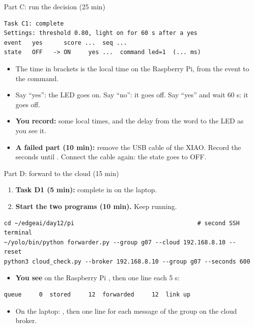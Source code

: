 \begin{frame}[fragile]{Part C: run the decision (25 min)}
\begin{lstlisting}[style=shell]
Task C1: complete
Settings: threshold 0.80, light on for 60 s after a yes
event   yes      score ...  seq ...
state   OFF   -> ON     yes ...  command led=1  (... ms)
\end{lstlisting}
  \small
  \begin{itemize}
    \item The time in brackets is the local time on the Raspberry Pi, from
          the event to the command.
    \item Say ``yes'': the LED goes on. Say ``no'': it goes off. Say ``yes''
          and wait 60 s: it goes off.
    \item \textbf{You record:} some local times, and the delay from the word
          to the LED as you see it.
    \item \textbf{A failed part (10 min):} remove the USB cable of the XIAO.
          Record the seconds until . Connect
          the cable again: the state goes to OFF.
  \end{itemize}
\end{frame}

\begin{frame}[fragile]{Part D: forward to the cloud (15 min)}
  \small
  \begin{enumerate}
    \item \textbf{Task D1 (5 min):} complete  in
           on the laptop.
    \item \textbf{Start the two programs (10 min).} Keep 
          running.
  \end{enumerate}
\begin{lstlisting}[style=shell]
cd ~/edgeai/day12/pi                                   # second SSH terminal
~/yolo/bin/python forwarder.py --group g07 --cloud 192.168.8.10 --reset
python3 cloud_check.py --broker 192.168.8.10 --group g07 --seconds 600
\end{lstlisting}
  \begin{itemize}
    \item \textbf{You see} on the Raspberry Pi ,
          then one line each 5 s:
  \end{itemize}
\begin{lstlisting}[style=shell]
queue     0  stored     12  forwarded     12  link up
\end{lstlisting}
  \begin{itemize}
    \item On the laptop: , then one line for each
          message of the group on the cloud broker.
  \end{itemize}
\end{frame}

